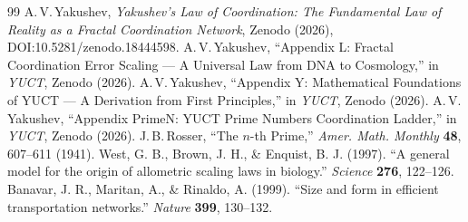 \documentclass[11pt,a4paper]{article}
\begin{document}
	\begin{thebibliography}{99}
		A.\,V.\,Yakushev, \emph{Yakushev's Law of Coordination: The Fundamental Law of Reality as a Fractal Coordination Network}, Zenodo (2026), DOI:10.5281/zenodo.18444598.
		A.\,V.\,Yakushev, ``Appendix L: Fractal Coordination Error Scaling — A Universal Law from DNA to Cosmology,'' in \emph{YUCT}, Zenodo (2026).
		A.\,V.\,Yakushev, ``Appendix Y: Mathematical Foundations of YUCT — A Derivation from First Principles,'' in \emph{YUCT}, Zenodo (2026).
		A.\,V.\,Yakushev, ``Appendix PrimeN: YUCT Prime Numbers Coordination Ladder,'' in \emph{YUCT}, Zenodo (2026).
		J.\,B.\,Rosser, ``The \(n\)-th Prime,'' \emph{Amer. Math. Monthly} \textbf{48}, 607--611 (1941).
		West, G. B., Brown, J. H., \& Enquist, B. J. (1997). ``A general model for the origin of allometric scaling laws in biology.'' \emph{Science} \textbf{276}, 122--126.
		Banavar, J. R., Maritan, A., \& Rinaldo, A. (1999). ``Size and form in efficient transportation networks.'' \emph{Nature} \textbf{399}, 130--132.
	\end{thebibliography}
	
\end{document}
